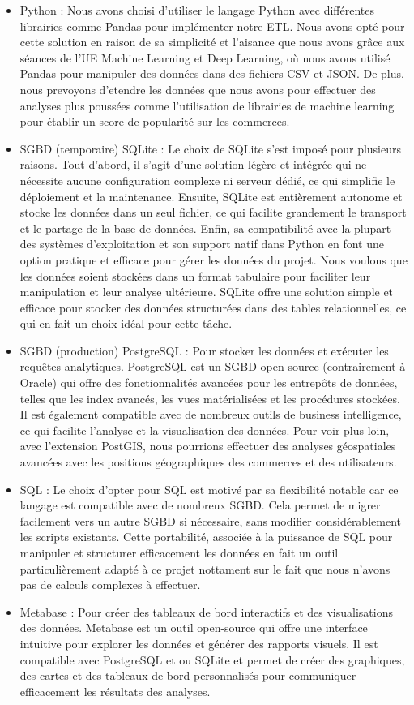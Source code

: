 \begin{itemize}

\item Python : Nous avons choisi d’utiliser le langage Python avec différentes librairies comme Pandas pour implémenter notre ETL. Nous avons opté pour cette solution en raison de sa simplicité et l'aisance que nous avons grâce aux séances de l'UE Machine Learning et Deep Learning, où nous avons utilisé Pandas pour manipuler des données dans des fichiers CSV et JSON\@.
De plus, nous prevoyons d'etendre les données que nous avons pour effectuer des analyses plus poussées comme l'utilisation de librairies de machine learning pour établir un score de popularité sur les commerces.
\item SGBD (temporaire) SQLite : Le choix de SQLite s’est imposé pour plusieurs raisons. Tout d’abord, il s’agit d’une solution légère et intégrée qui ne nécessite aucune configuration complexe ni serveur dédié,
ce qui simplifie le déploiement et la maintenance. Ensuite, SQLite est entièrement autonome et stocke les données dans un seul fichier, ce qui facilite grandement le transport et le
partage de la base de données. Enfin, sa compatibilité avec la plupart des systèmes d’exploitation et son support natif dans Python en font une option pratique et efficace pour
gérer les données du projet. Nous voulons que les données soient stockées dans un format tabulaire pour faciliter leur manipulation et leur analyse ultérieure.
SQLite offre une solution simple et efficace pour stocker des données structurées dans des tables relationnelles, ce qui en fait un choix idéal pour cette tâche.
\item SGBD (production) PostgreSQL : Pour stocker les données et exécuter les requêtes analytiques.
PostgreSQL est un SGBD open-source (contrairement à Oracle) qui offre des fonctionnalités avancées pour les entrepôts de données, telles que les index avancés, les vues matérialisées et les procédures stockées.
Il est également compatible avec de nombreux outils de business intelligence, ce qui facilite l’analyse et la visualisation des données. Pour voir plus loin, avec l'extension PostGIS, nous pourrions effectuer des analyses géospatiales avancées avec les positions géographiques des commerces et des utilisateurs.
\item SQL : Le choix d'opter pour SQL est motivé par sa flexibilité notable car ce langage est compatible avec de nombreux SGBD. Cela permet de migrer facilement vers un autre SGBD si nécessaire, sans modifier considérablement les scripts existants.
Cette portabilité, associée à la puissance de SQL pour manipuler et structurer efficacement les données en fait un outil particulièrement adapté à ce projet nottament sur le fait que nous n'avons pas de calculs complexes à effectuer.
\item Metabase : Pour créer des tableaux de bord interactifs et des visualisations des données. Metabase est un outil open-source qui offre une interface intuitive pour explorer les données et générer des rapports visuels.
Il est compatible avec PostgreSQL et ou SQLite et permet de créer des graphiques, des cartes et des tableaux de bord personnalisés pour communiquer efficacement les résultats des analyses.
\end{itemize}


